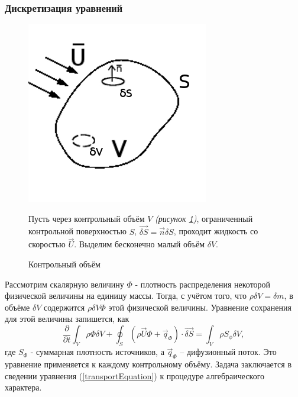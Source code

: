 		\subsubsection*{Дискретизация уравнений}
		\begin{figure}[ht]
			\begin{minipage}{0.43\linewidth}
				\includegraphics[scale=0.5]{controlVolume}
				\vspace{-2em}
				\caption{Контрольный объём}
				\label{fig:volume}
			\end{minipage}
			\hspace{-1em}
			\begin{minipage}{0.6\linewidth}
				\vspace{-2em}
				Пусть через контрольный объём $V$ \textit{(рисунок \ref{fig:volume})}, ограниченный контрольной поверхностью $S$, $\vec{\delta S} = \vec{n} \delta S$, проходит жидкость со скоростью $\vec{U}$. Выделим бесконечно малый объём $\delta V$. 
			\end{minipage}
		\end{figure}
		Рассмотрим скалярную величину $\Phi$ - плотность распределения некоторой физической величины на единицу массы. Тогда, с учётом того, что $\rho \delta V = \delta m$, в объёме $\delta V$ содержится $\rho \delta V \Phi$ этой физической величины. Уравнение сохранения для этой величины запишется, как
		\begin{equation}
			\frac{\partial}{\partial t} \int_V \rho \Phi \delta V + \oint_S \left( \rho \vec{U} \Phi + \vec{q}_{\Phi}  \right)\cdot \vec{\delta S} = \int_V \rho S_{\phi} \delta V,
			\label{transportEquation}
		\end{equation}
		где $S_{\Phi}$ - суммарная плотность источников, а $\vec{q}_{\Phi}$ -- дифузионный поток. Это уравнение применяется к каждому контрольному объёму. Задача заключается в сведении уравнения (\ref{transportEquation}) к процедуре алгебраического характера.
		
